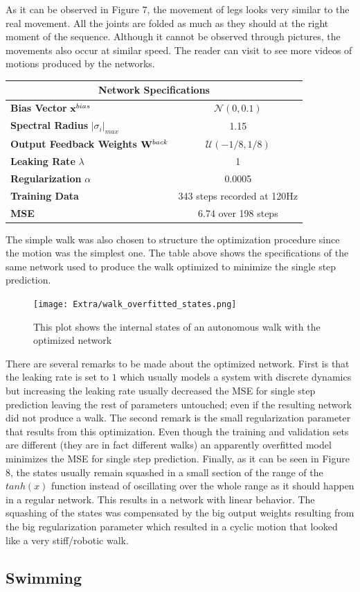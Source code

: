 \documentclass[letterpaper,9pt]{article}
\newcommand{\networkSpecs}[7]{
  \begin{center}
  \begin{tabular}{ | l | c | }
    \hline
    \multicolumn{2}{|c|}{{\bf Network Specifications}} \\
    \hline
    {\bf Bias Vector} ${\bf x}^{bias}$ & $\mathcal{N}(#1)$ \\
    \hline
    {\bf Spectral Radius} $|\sigma_i|_{max}$ & #2 \\
    \hline
    {\bf Output Feedback Weights} ${\bf W}^{back}$ & $\mathcal{U}(#3)$ \\
    \hline
    {\bf Leaking Rate} $\lambda$ & #4 \\
    \hline
    {\bf Regularization} $\alpha$ & #5\\
    \hline
    {\bf Training Data} & #6\\
    \hline
    {\bf MSE} & #7\\
    \hline
  \end{tabular}    
  \end{center}
}
\begin{document}
As it can be observed in Figure 7, the movement of legs looks very similar to the real movement. All the joints are folded as much as they should at the right moment of the sequence. Although it cannot be observed through pictures, the movements also occur at similar speed. The reader can visit \cite{LambdaNN} to see more videos of motions produced by the networks.

\networkSpecs{0,0.1}
             {1.15}
             {-1/8,1/8}
             {1}
             {0.0005}
             {343 steps recorded at 120Hz}
             {6.74 over 198 steps}

The simple walk was also chosen to structure the optimization procedure since the motion was the simplest one. The table above shows the specifications of the same network used to produce the walk optimized to minimize the single step prediction. 

\begin{figure}[h!]
  \centering
  \texttt{[image: Extra/walk\_overfitted\_states.png]}
  \caption[Simple Walk Optimized States]{This plot shows the internal states of an autonomous walk with the optimized network}
\end{figure}

There are several remarks to be made about the optimized network. First is that the leaking rate is set to $1$ which usually models a system with discrete dynamics but increasing the leaking rate usually decreased the MSE for single step prediction leaving the rest of parameters untouched; even if the resulting network did not produce a walk. The second remark is the small regularization parameter that results from this optimization. Even though the training and validation sets are different (they are in fact different walks) an apparently overfitted model minimizes the MSE for single step prediction. Finally, as it can be seen in Figure 8, the states usually remain squashed in a small section of the range of the $tanh(x)$ function instead of oscillating over the whole range as it should happen in a regular network. This results in a network with linear behavior. The squashing of the states was compensated by the big output weights resulting from the big regularization parameter which resulted in a cyclic motion that looked like a very stiff/robotic walk.

\subsection{Swimming}
\end{document}
